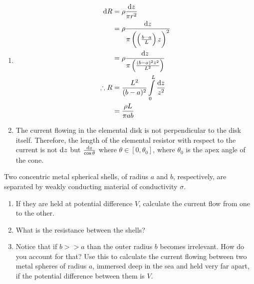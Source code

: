 \documentclass[fleqn, a4paper, 11pt, oneside]{amsart}
\theoremstyle{definition}
\theoremstyle{theorem}
\begin{document}
\begin{solution}
	\begin{enumerate}[leftmargin = *]
		\item
			\begin{align*}
				\dif R       & = \rho \frac{\dif z}{\pi r^2}                                              \\
                                             & = \rho \frac{\dif z}{\pi \left( \left( \frac{b - a}{L} \right)z \right)^2} \\
                                             & = \rho \frac{\dif z}{\pi \left( \frac{(b - a)^2 z^2}{L^2} \right)}         \\
				\therefore R & = \frac{L^2}{(b - a)^2}\int\limits_{0}^{L} \frac{\dif z}{z^2}              \\
                                             & = \frac{\rho L}{\pi a b}
			\end{align*}
		\item
			The current flowing in the elemental disk is not perpendicular to the disk itself.
			Therefore, the length of the elemental resistor with respect to the current is not $\dif z$ but $\frac{\dif z}{\cos \theta}$ where $\theta \in [0, \theta_0]$, where $\theta_0$ is the apex angle of the cone.
	\end{enumerate}
\end{solution}

\begin{question}
	Two concentric metal spherical shells, of radius $a$ and $b$, respectively, are separated by weakly conducting material of conductivity $\sigma$.
	\begin{enumerate}
		\item If they are held at potential difference $V$, calculate the current flow from one to the other.
		\item What is the resistance between the shells?
		\item
			Notice that if $b >> a$ than the outer radius $b$ becomes irrelevant.
			How do you account for that?
			Use this to calculate the current flowing between two metal spheres of radius $a$, immersed deep in the sea and held very far apart, if the potential difference between them is $V$.
	\end{enumerate}
\end{question}
\end{document}
